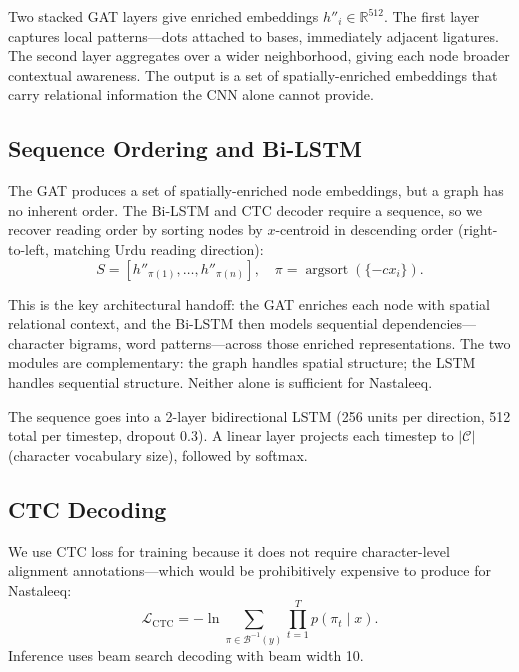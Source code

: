\documentclass[11pt]{article}
\begin{document}
Two stacked GAT layers give enriched embeddings $h''_i \in \mathbb{R}^{512}$.
The first layer captures local patterns---dots attached to bases, immediately adjacent
ligatures.
The second layer aggregates over a wider neighborhood, giving each node broader
contextual awareness.
The output is a set of spatially-enriched embeddings that carry relational information
the CNN alone cannot provide.

\subsection{Sequence Ordering and Bi-LSTM}

The GAT produces a set of spatially-enriched node embeddings, but a graph has no
inherent order.
The Bi-LSTM and CTC decoder require a sequence, so we recover reading order by sorting
nodes by $x$-centroid in descending order (right-to-left, matching Urdu reading
direction):
\begin{equation}
  S = \left[h''_{\pi(1)}, \ldots, h''_{\pi(n)}\right],\quad
  \pi = \operatorname{argsort}(\{-cx_i\}).
  \label{eq:sort}
\end{equation}

This is the key architectural handoff: the GAT enriches each node with spatial relational
context, and the Bi-LSTM then models sequential dependencies---character bigrams, word
patterns---across those enriched representations.
The two modules are complementary: the graph handles spatial structure; the LSTM handles
sequential structure.
Neither alone is sufficient for Nastaleeq.

The sequence goes into a 2-layer bidirectional LSTM (256 units per direction, 512 total
per timestep, dropout 0.3).
A linear layer projects each timestep to $|\mathcal{C}|$ (character vocabulary size),
followed by softmax.

\subsection{CTC Decoding}

We use CTC loss \citep{graves2006ctc} for training because it does not require
character-level alignment annotations---which would be prohibitively expensive to produce
for Nastaleeq:
\begin{equation}
  \mathcal{L}_{\text{CTC}} = -\ln \sum_{\pi \in \mathcal{B}^{-1}(y)} \prod_{t=1}^{T} p(\pi_t \mid x).
  \label{eq:ctc}
\end{equation}
Inference uses beam search decoding with beam width 10.
\end{document}
